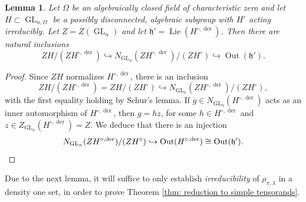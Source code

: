 \documentclass{amsart}
\newtheorem{lemma}[theorem]{Lemma}
\theoremstyle{definition}
\numberwithin{equation}{section} %
\newcommand{\GL}{\operatorname{GL}}
\newcommand{\Lie}{\operatorname{Lie}}
\newcommand{\der}{\operatorname{der}}
\newcommand{\Out}{\operatorname{Out}}
\newcommand{\mf}[1]{\mathfrak{#1}}
\begin{document}
\begin{lemma} \label{lemma: pi_0 embeds in out(g)}
Let $\Omega$ be an algebraically closed field of characteristic zero and let $H \subset \GL_{n,\Omega}$ be a possibly disconnected, algebraic subgroup with $H^\circ$ acting irreducibly.
Let $Z = Z(\GL_n)$ and let $\mf{h}' = \Lie(H^{\circ,\der})$.
Then there are natural inclusions
\[Z H/(Z H^{\circ,\der}) \hookrightarrow N_{\GL_n}(Z H^{\circ,\der})/(ZH^\circ) \hookrightarrow \Out(\mf{h}').\]
\end{lemma}
\begin{proof}
Since $Z H$ normalizes $H^{\circ,\der}$, there is an inclusion
\[
Z H/ (Z H^{\circ,\der}) = Z H/ (Z H^\circ) \hookrightarrow N_{\GL_n}(Z H^{\circ,\der})/(ZH^\circ),
\]
with the first equality holding by Schur's lemma.
If $g \in N_{\GL_n}(H^{\circ,\der})$ acts as an inner automorphism of $H^{\circ,\der}$, then $g = hz$, for some $h \in H^{\circ,\der}$ and $z \in Z_{\GL_n}(H^{\circ,\der}) = Z$.
We deduce that there is an injection
\[
N_{\GL_n}(Z H^{\circ,\der})/(ZH^\circ) \hookrightarrow \Out(H^{\circ,\der}) \cong \Out(\mf{h}'). \qedhere
\]
\end{proof}

Due to the next lemma, it will suffice to only establish \emph{irreducibility} of $\rho_{\pi,\lambda}$ in a density one set, in order to prove Theorem \ref{thm: reduction to simple tensorands}.
\end{document}
